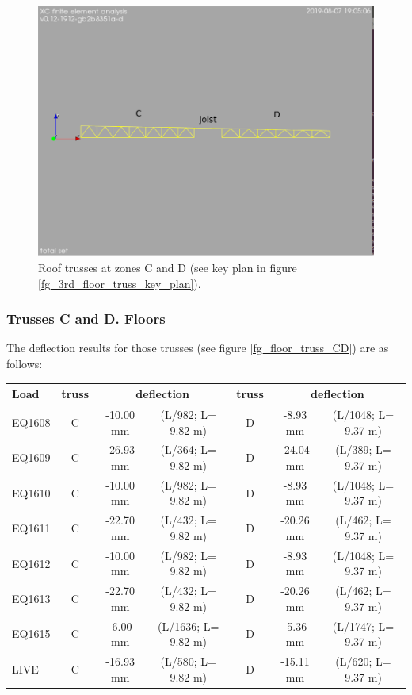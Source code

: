 \begin{figure}
  \begin{center}
  \includegraphics[width=120mm]{figures/roof_truss_CD}
  \end{center}
  \caption{Roof trusses at zones C and D (see key plan in figure \ref{fg_3rd_floor_truss_key_plan}).}\label{fg_roof_truss_CD}
\end{figure}

\subsubsection{Trusses C and D. Floors}
The deflection results for those trusses (see figure \ref{fg_floor_truss_CD}) are as follows:

\begin{center}
  \begin{scriptsize}
  \begin{tabular}{|l|c|c|c|c|c|c|}
    \hline
    \textbf{Load} & \textbf{truss} & \multicolumn{2}{c|}{\textbf{deflection}} & \textbf{truss} & \multicolumn{2}{c|}{\textbf{deflection}} \\
    \hline
EQ1608 & C & -10.00 mm & (L/982; L= 9.82 m) & D & -8.93 mm & (L/1048; L= 9.37 m) \\
EQ1609 & C & -26.93 mm & (L/364; L= 9.82 m) & D & -24.04 mm & (L/389; L= 9.37 m) \\
EQ1610 & C & -10.00 mm & (L/982; L= 9.82 m) & D & -8.93 mm & (L/1048; L= 9.37 m) \\
EQ1611 & C & -22.70 mm & (L/432; L= 9.82 m) & D & -20.26 mm & (L/462; L= 9.37 m) \\
EQ1612 & C & -10.00 mm & (L/982; L= 9.82 m) & D & -8.93 mm & (L/1048; L= 9.37 m) \\
EQ1613 & C & -22.70 mm & (L/432; L= 9.82 m) & D & -20.26 mm & (L/462; L= 9.37 m) \\
EQ1615 & C & -6.00 mm & (L/1636; L= 9.82 m) & D & -5.36 mm & (L/1747; L= 9.37 m) \\
LIVE & C & -16.93 mm & (L/580; L= 9.82 m) & D & -15.11 mm & (L/620; L= 9.37 m) \\
\hline
  \end{tabular}
  \end{scriptsize}
\end{center}


